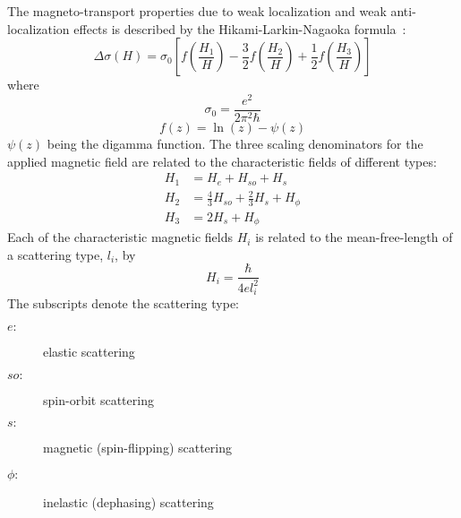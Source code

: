 The magneto-transport properties due to weak localization and weak anti-localization effects is described by the Hikami-Larkin-Nagaoka formula~\cite{WL_HLN, bergmann1984}:%
\begin{equation}\label{eq:hln}
    \Delta\sigma(H) = \sigma_0\left[f\left(\frac{H_1}{H}\right) - \frac{3}{2}f\left(\frac{H_2}{H}\right) + \frac{1}{2}f\left(\frac{H_3}{H}\right)\right]
\end{equation}%
where%
\begin{equation}\label{eq:sigma0}
    \sigma_0 = \frac{e^2}{2\pi^2\hbar}
\end{equation}
\begin{equation}
    f(z) = \ln(z) - \psi(z)
\end{equation}
$\psi(z)$ being the digamma function. The three scaling denominators for the applied magnetic field are related to the characteristic fields of different types:%
\begin{align}
    H_1 &= H_e + H_{so} + H_s\nonumber\\
    H_2 &= \frac{4}{3}H_{so} + \frac{2}{3}H_s + H_\phi\\
    H_3 &= 2H_s + H_\phi\nonumber
\end{align}
Each of the characteristic magnetic fields $H_i$ is related to the mean-free-length of a scattering type, $l_i$, by
\begin{equation}
    H_i = \frac{\hbar}{4el_i^2}
\end{equation}
The subscripts denote the scattering type:%
\begin{description}
    \item [$e:$] elastic scattering
    \item [$so:$] spin-orbit scattering
    \item [$s:$] magnetic (spin-flipping) scattering
    \item [$\phi:$] inelastic (dephasing) scattering
\end{description}